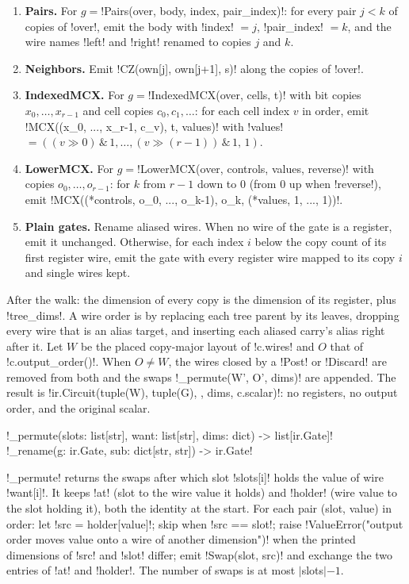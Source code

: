 \begin{algorithm}[Expansion]
\begin{enumerate}
\item \textbf{Pairs.} For $g=$\py!Pairs(over, body, index, pair_index)!: for every pair $j<k$ of copies of \py!over!, emit the body with \py!index! $=j$, \py!pair_index! $=k$, and the wire names \code!left! and \code!right! renamed to copies $j$ and $k$.
\item \textbf{Neighbors.} Emit \py!CZ(own[j], own[j+1], s)! along the copies of \py!over!.
\item \textbf{IndexedMCX.} For $g=$\py!IndexedMCX(over, cells, t)! with bit copies $x_0,\ldots,x_{r-1}$ and cell copies $c_0,c_1,\ldots$: for each cell index $v$ in order, emit \py!MCX((x_0, ..., x_{r-1}, c_v), t, values)! with \py!values! $=((v\gg0)\,\&\,1,\ldots,(v\gg(r-1))\,\&\,1,\,1)$.
\item \textbf{LowerMCX.} For $g=$\py!LowerMCX(over, controls, values, reverse)! with copies $o_0,\ldots,o_{r-1}$: for $k$ from $r-1$ down to $0$ (from $0$ up when \py!reverse!), emit \py!MCX((*controls, o_0, ..., o_{k-1}), o_k, (*values, 1, ..., 1))!.
\item \textbf{Plain gates.} Rename aliased wires. When no wire of the gate is a register, emit it unchanged. Otherwise, for each index $i$ below the copy count of its first register wire, emit the gate with every register wire mapped to its copy $i$ and single wires kept.
\end{enumerate}
After the walk: the dimension of every copy is the dimension of its register, plus \py!tree_dims!. A wire order is  by replacing each tree parent by its leaves, dropping every wire that is an alias target, and inserting each aliased carry's alias right after it. Let $W$ be the placed copy-major layout of \py!c.wires! and $O$ that of \py!c.output_order()!. When $O\neq W$, the wires closed by a \py!Post! or \py!Discard! are removed from both and the swaps \py!_permute(W', O', dims)! are appended. The result is \py!ir.Circuit(tuple(W), tuple(G), {}, dims, c.scalar)!: no registers, no output order, and the original scalar.
\end{algorithm}

\begin{signature}
\py!_permute(slots: list[str], want: list[str], dims: dict) -> list[ir.Gate]!\\
\py!_rename(g: ir.Gate, sub: dict[str, str]) -> ir.Gate!
\end{signature}

\py!_permute! returns the swaps after which slot \py!slots[i]! holds the value of wire \py!want[i]!. It keeps \py!at! (slot to the wire value it holds) and \py!holder! (wire value to the slot holding it), both the identity at the start. For each pair (slot, value) in order: let \py!src = holder[value]!; skip when \py!src == slot!; raise \py!ValueError("output order moves value onto a wire of another dimension")! when the printed dimensions of \py!src! and \py!slot! differ; emit \py!Swap(slot, src)! and exchange the two entries of \py!at! and \py!holder!. The number of swaps is at most $|$slots$|-1$.

